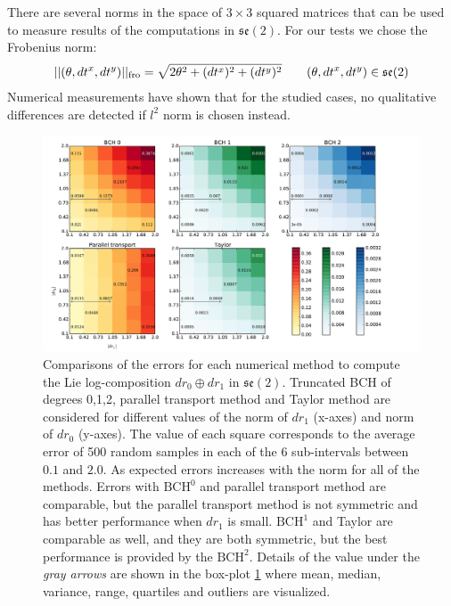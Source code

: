 There are several norms in the space of $3\times 3$ squared matrices that can be used to measure results of the computations in $\mathfrak{se}(2)$. For our tests we chose the Frobenius norm:
\begin{align*}
\vert\lvert (\theta,dt^{x},dt^{y}) \rvert\vert_{\text{fro}} = \sqrt{2\theta^{2} + (dt^{x})^2 + (dt^{y})^2} 
\qquad
(\theta,dt^{x},dt^{y}) \in \mathfrak{se}(2)
\end{align*}
Numerical measurements have shown that for the studied cases, no qualitative differences are detected if $l^{2}$ norm is chosen instead.
 \begin{figure}[!ht]
 	\hspace{-1.3cm}
 	\includegraphics[scale=0.50]{figures/se2_image_scale.pdf}
 	\caption{Comparisons of the errors for each numerical method to compute the Lie log-composition $dr_{0} \oplus dr_{1}$ in $\mathfrak{se}(2)$. Truncated BCH of degrees 0,1,2, parallel transport method and Taylor method are considered for different values of the norm of $dr_{1}$ (x-axes) and norm of $dr_{0}$ (y-axes). 
 	The value of each square corresponds to the average error of 500 random samples in each of the 6 sub-intervals between $0.1$ and $2.0$. 
 	As expected errors increases with the norm for all of the methods.
 	Errors with $\text{BCH}^0$ and parallel transport method are comparable, but the parallel transport method is not symmetric and has better performance when $dr_{1}$ is small. $\text{BCH}^1$ and Taylor are comparable as well, and they are both symmetric, but the best performance is provided by the $\text{BCH}^2$. Details of the value under the \emph{gray arrows} are shown in the box-plot \ref{fig:se2_image_scale} where mean, median, variance, range, quartiles and outliers are visualized.
 	 }
 	\label{fig:se2_image_scale}
 \end{figure}
